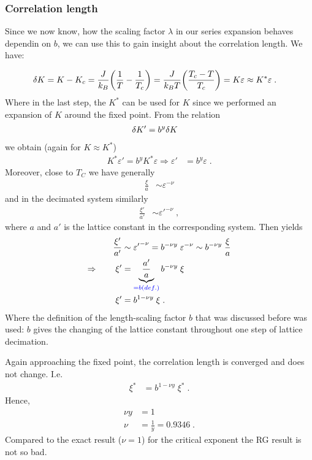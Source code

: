 \subsubsection{Correlation length}
Since we now know, how the scaling factor $\lambda$ in our series expansion behaves dependin on $b$, we can use this to gain insight about the correlation length. We have:

%
\begin{align*}
\var K &= K - K_{c} = \frac{J}{k_{B} } \qty(\frac{1}{T} - \frac{1}{T_{c}})
= \frac{J}{k_{B} T} \qty(\frac{T_{c}-T}{T_{c}}) = K \varepsilon \approx K^* \varepsilon\;.
\end{align*}
%
Where in the last step, the $K^*$ can be used for $K$ since we performed an expansion of $K$ around the fixed point. From the relation
%
\begin{align*}
\var K' &= b^{y} \var K
\end{align*}
%
we obtain (again for $K\approx K^*$)
\begin{align}\label{eq:epsilon}
K^*\varepsilon' = b^y K^*\varepsilon \Rightarrow \varepsilon' &= b^{y} \varepsilon\;.
\end{align}
%
Moreover, close to $T_{C}$ we have generally
%
\begin{align*}
\frac{\xi}{a} &\sim \varepsilon^{-\nu}
\end{align*}
%
and in the decimated system similarly
%
\begin{align*}
\frac{\xi'}{a'} &\sim {\varepsilon'}^{-\nu}\;,
\end{align*}
%
where $a$ and $a'$ is the lattice constant in the corresponding system.
Then  yields
%
\begin{align*}
\frac{\xi'}{a'} &\sim  {\varepsilon'}^{-\nu} =  b^{-\nu y}\;\varepsilon^{-\nu}\sim   b^{-\nu y}\;\frac{\xi}{a}\\
\Rightarrow\qquad \xi' &=  \underbrace{
\frac{a'}{a}
}_{\color{blue} = b (def.)} b^{- \nu y} \;\xi\\
\xi' &= b^{1 - \nu y} \;\xi\;.
\end{align*}
%
Where the definition of the length-scaling factor $b$ that was discussed before was used: $b$ gives the changing of the lattice constant throughout one step of lattice decimation.

Again approaching the fixed point, the correlation length is converged and does not change. I.e.
%
\begin{align*}
\xi^{*} &= b^{1 - \nu y} \;\xi^{*}\;.
\end{align*}
%
Hence,
%
\begin{align*}
\nu y  &= 1\\
\nu &= \frac{1}{y} = 0.9346\;.
\end{align*}
%
Compared to the exact result ($\nu=1$) for the critical exponent the RG result is not so bad.




